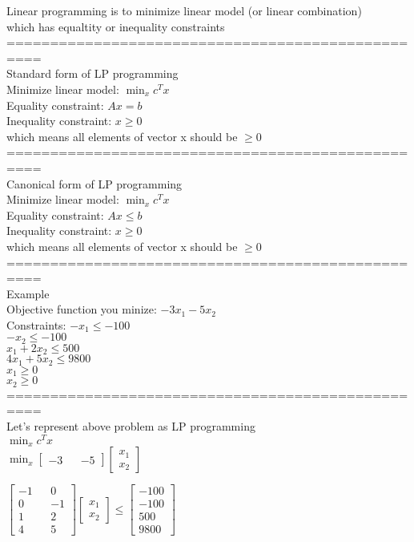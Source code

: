 \documentclass{article}
\begin{document}
Linear programming is to minimize linear model (or linear combination) \\
which has equaltity or inequality constraints \\

================================================== \\
Standard form of LP programming \\ 
Minimize linear model: $\min_x c^Tx$ \\ 
Equality constraint: $Ax=b$ \\ 
Inequality constraint: $x \ge 0$ \\ 
which means all elements of vector x should be $\ge 0$ \\ 

================================================== \\
Canonical form of LP programming \\ 
Minimize linear model: $\min_x c^Tx$ \\ 
Equality constraint: $Ax\le b$ \\ 
Inequality constraint: $x \ge 0$ \\ 
which means all elements of vector x should be $\ge 0$ \\ 

================================================== \\
Example \\ 
Objective function you minize: $-3x_1-5x_2$ \\ 
Constraints: 
$-x_1\le -100$ \\
$-x_2\le -100$ \\
$x_1+2x_2\le 500$ \\
$4x_1+5x_2\le 9800$ \\
$x_1\ge 0$ \\
$x_2\ge 0$ \\

================================================== \\
Let's represent above problem as LP programming \\ 

$\min_x c^Tx$ \\ 
$\min_x \begin{bmatrix}
-3 && -5
\end{bmatrix}
\begin{bmatrix}
x_1\\x_2
\end{bmatrix}$

$\begin{bmatrix}
-1 && 0\\0 && -1\\1 && 2\\4 && 5
\end{bmatrix}
\begin{bmatrix}
x_1\\x_2
\end{bmatrix}
\le
\begin{bmatrix}
-100\\-100\\500\\9800
\end{bmatrix}$
\end{document}
